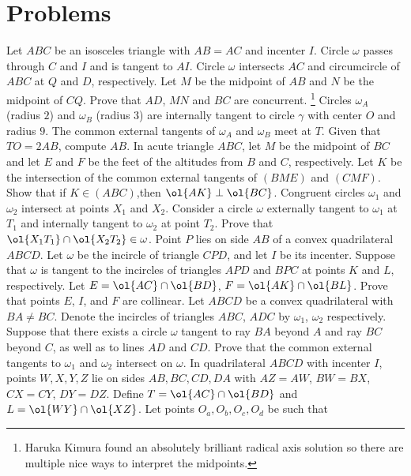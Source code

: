 \documentclass{seto}
\begin{document}
\section{Problems}
 Let $ABC$ be an isosceles triangle with $AB=AC$ and incenter $I$. 
 Circle $\omega$ passes through $C$ and $I$ and is tangent to $AI$. 
 Circle $\omega$ intersects $AC$ and circumcircle of $ABC$ at $Q$ and $D$, respectively. 
 Let $M$ be the midpoint of $AB$ and $N$ be the midpoint of $CQ$. 
 Prove that $AD$, $MN$ and $BC$ are concurrent.
\footnote{Haruka Kimura found an absolutely brilliant radical axis solution
 so there are multiple nice ways to interpret the midpoints.}
\exercise[ARML 2024/I10] Circles $\omega_A$ (radius $2$) and $\omega_B$ (radius $3$) 
are internally tangent to circle $\gamma$ with center $O$ and radius $9$.
 The common external tangents of $\omega_A$ and $\omega_B$ meet at $T$. 
 Given that $TO = 2AB$, compute $AB$.
 In acute triangle $ABC$, 
let $M$ be the midpoint of $BC$ and let $E$ and $F$ be the feet of the altitudes from $B$ and $C$, respectively. 
Let $K$ be the intersection of the common external tangents of $(BME)$ and $(CMF)$. 
Show that if $K\in (ABC)$,then $\ol{AK}\perp\ol{BC}$.
\exercise[EGMO 2016/4] Congruent circles $\omega_1$ and $\omega_2$ intersect at points $X_1$ and $X_2$. 
 Consider a circle $\omega$ externally tangent to $\omega_1$ at $T_1$ 
 and internally tangent to $\omega_2$ at point $T_2$. Prove that $\ol{X_1T_1}\cap\ol{X_2T_2}\in\omega$.
\exercise[ISL 2007/G8] Point $ P$ lies on side $AB$ of a convex quadrilateral 
 $ABCD$. Let $\omega$ be the incircle of triangle $CPD$, 
 and let $ I$ be its incenter. 
 Suppose that $\omega$ is tangent to the incircles of triangles $APD$ and 
 $BPC$ at points $K$ and $L$, respectively. 
 Let $E=\ol{AC}\cap\ol{BD}$, $F=\ol{AK}\cap\ol{BL}$.
 Prove that points $E$, $I$, and $F$ are collinear. 
\exercise[IMO 2008/6] Let $ABCD$ be a convex quadrilateral with $BA \neq BC$. 
Denote the incircles of triangles $ABC$, $ADC$ by $\omega_1$, $\omega_2$ respectively. 
Suppose that there exists a circle $\omega$ tangent to ray $BA$ beyond $A$ and ray $BC$ beyond $C$, 
as well as to lines $AD$ and $CD$.
Prove that the common external tangents to $\omega_1$ and $\omega_2$ intersect on $\omega$.
\exercise[ELMO SL 2024/G4, by me] In quadrilateral $ABCD$ with incenter $I$,
 points $W,X,Y,Z$ lie on sides $AB, BC,CD,DA$ with 
 $AZ=AW$, $BW=BX$, $CX=CY$, $DY=DZ$. 
 Define $T=\ol{AC}\cap\ol{BD}$ and $L=\ol{WY}\cap\ol{XZ}$. 
 Let points $O_a,O_b,O_c,O_d$ be such that 
\end{document}
